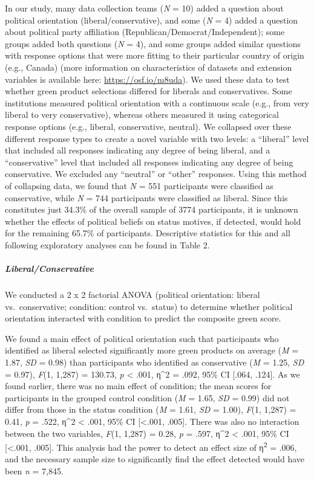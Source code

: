 \documentclass[
]{article}
\begin{document}
In our study, many data collection teams (\emph{N} = 10) added a
question about political orientation (liberal/conservative), and some
(\emph{N} = 4) added a question about political party affiliation
(Republican/Democrat/Independent); some groups added both questions
(\emph{N} = 4), and some groups added similar questions with response
options that were more fitting to their particular country of origin
(e.g., Canada) (more information on characteristics of datasets and
extension variables is available here: \url{https://osf.io/m8uda}). We
used these data to test whether green product selections differed for
liberals and conservatives. Some institutions measured political
orientation with a continuous scale (e.g., from very liberal to very
conservative), whereas others measured it using categorical response
options (e.g., liberal, conservative, neutral). We collapsed over these
different response types to create a novel variable with two levels: a
``liberal'' level that included all responses indicating any degree of
being liberal, and a ``conservative'' level that included all responses
indicating any degree of being conservative. We excluded any ``neutral''
or ``other'' responses. Using this method of collapsing data, we found
that \emph{N} = 551 participants were classified as conservative, while
\emph{N} = 744 participants were classified as liberal. Since this
constitutes just 34.3\% of the overall sample of 3774 participants, it
is unknown whether the effects of political beliefs on status motives,
if detected, would hold for the remaining 65.7\% of participants.
Descriptive statistics for this and all following exploratory analyses
can be found in Table 2.

\subparagraph{Liberal/Conservative}\label{liberalconservative}

We conducted a 2 x 2 factorial ANOVA (political orientation: liberal
vs.~conservative; condition: control vs.~status) to determine whether
political orientation interacted with condition to predict the composite
green score.

We found a main effect of political orientation such that participants
who identified as liberal selected significantly more green products on
average (\emph{M} = 1.87, \emph{SD} = 0.98) than participants who
identified as conservative (\emph{M} = 1.25, \emph{SD} = 0.97),
\emph{F}(1, 1,287) = 130.73, \emph{p} \textless{} .001, η\^{}2 = .092,
95\% CI {[}.064, .124{]}. As we found earlier, there was no main effect
of condition; the mean scores for participants in the grouped control
condition (\emph{M} = 1.65, \emph{SD} = 0.99) did not differ from those
in the status condition (\emph{M} = 1.61, \emph{SD} = 1.00), \emph{F}(1,
1,287) = 0.41, \emph{p} = .522, η\^{}2 \textless{} .001, 95\% CI
{[}\textless.001, .005{]}. There was also no interaction between the two
variables, \emph{F}(1, 1,287) = 0.28, \emph{p} = .597, η\^{}2
\textless{} .001, 95\% CI {[}\textless.001, .005{]}. This analysis had
the power to detect an effect size of η\textsuperscript{2} = .006, and
the necessary sample size to significantly find the effect detected
would have been \emph{n} = 7,845.
\end{document}
